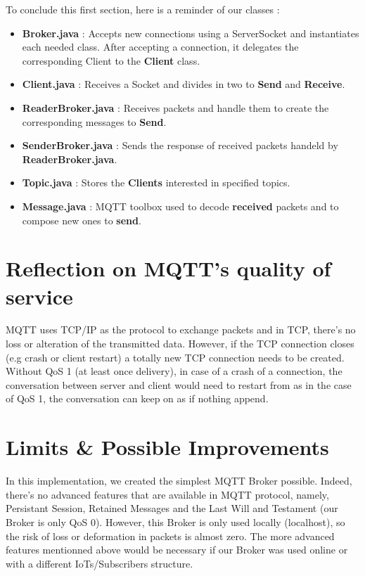 \documentclass[12pt]{article}
\begin{document}
 To conclude this first section, here is a reminder of our classes :
 \begin{itemize}
	 \item \textbf{Broker.java} : Accepts new connections using a ServerSocket and instantiates each needed class. After accepting a connection, it delegates 
	 the corresponding Client to the \textbf{Client} class.
	 \item \textbf{Client.java} : Receives a Socket and divides in two to \textbf{Send} and \textbf{Receive}.
	 \item \textbf{ReaderBroker.java} : Receives packets and handle them to create the corresponding messages to \textbf{Send}.
	 \item \textbf{SenderBroker.java} : Sends the response of received packets handeld by \textbf{ReaderBroker.java}.
	 \item \textbf{Topic.java} : Stores the \textbf{Clients} interested in specified topics.
	 \item \textbf{Message.java} : MQTT toolbox used to decode \textbf{received} packets and to compose new ones to \textbf{send}.
 \end{itemize}

 \section{Reflection on MQTT's quality of service}
 MQTT uses TCP/IP as the protocol to exchange packets and in TCP, there's no loss or alteration of the transmitted data. However, if the TCP connection 
 closes (e.g crash or client restart) a totally new TCP connection needs to be created. Without QoS 1 (at least once delivery), in case of a crash of a connection, 
 the conversation between server and client would need to restart from as in the case of QoS 1, the conversation can keep on as if nothing append.

 \section{Limits \& Possible Improvements}
 In this implementation, we created the simplest MQTT Broker possible. Indeed, there's no advanced features that are available in MQTT protocol, namely, Persistant Session, 
 Retained Messages and the Last Will and Testament (our Broker is only QoS 0). However, this Broker is only used locally (localhost), so the risk of loss or deformation in packets is almost zero. 
 The more advanced features mentionned above would be necessary if our Broker was used online or with a different IoTs/Subscribers structure. 

 
\end{document}
